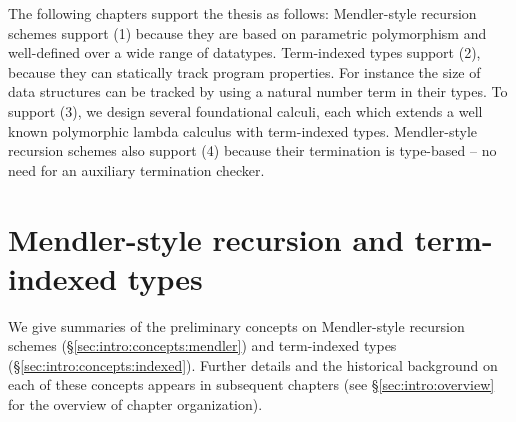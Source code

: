 The following chapters support the thesis as follows:
Mendler-style recursion schemes support (1) because they are based on
parametric polymorphism and well-defined over a wide range of datatypes.
Term-indexed types support (2), because they can statically track
program properties. For instance the size of data structures can
be tracked by using a natural number term in their types.
To support (3), we design several foundational calculi, each which extends
a well known polymorphic lambda calculus with term-indexed types.
Mendler-style recursion schemes also support (4) because their
termination is type-based -- no need for an auxiliary termination checker.

\section{Mendler-style recursion and term-indexed types}
\label{sec:intro:concepts}
We give summaries of the preliminary concepts on
Mendler-style recursion schemes (\S\ref{sec:intro:concepts:mendler})
and term-indexed types (\S\ref{sec:intro:concepts:indexed}).
Further details and the historical background on each of these concepts
appears in subsequent chapters (see \S\ref{sec:intro:overview}
for the overview of chapter organization).

